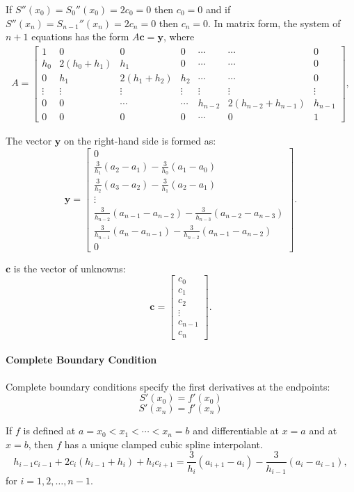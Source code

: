 \documentclass[a4paper]{article}
\begin{document}
\begin{sloppypar}
If \( S''(x_0) = S_0''(x_0) = 2c_0 = 0 \) then \( c_0 = 0 \) and if \( S''(x_n) = S_{n-1}''(x_n) = 2c_n = 0 \) then \( c_n = 0 \).
In matrix form, the system of $n+1$ equations has the form $A\mathbf{c} = \mathbf{y}$, where
$$
\begin{aligned}
A = \begin{bmatrix}
1 & 0 & 0 & 0 & \cdots & \cdots &0 \\
h_0 & 2(h_0 + h_1) & h_1 & 0 & \cdots& \cdots & 0 \\
0 & h_1 & 2(h_1 + h_2) & h_2 & \cdots& \cdots & 0 \\
\vdots & \vdots & \vdots & \vdots & \vdots & \vdots&\vdots \\
0 & 0 & \cdots & \cdots& h_{n-2} & 2(h_{n-2} + h_{n-1}) & h_{n-1} \\
0 & 0 & 0 & 0 & \cdots& 0 & 1
\end{bmatrix},
\end{aligned}
$$

The vector \(\mathbf{y}\) on the right-hand side is formed as:
\[
\mathbf{y} = \begin{bmatrix}
0 \\
\frac{3}{h_1}(a_2 - a_1) - \frac{3}{h_0}(a_1 - a_0) \\
\frac{3}{h_2}(a_3 - a_2) - \frac{3}{h_1}(a_2 - a_1) \\
\vdots \\
\frac{3}{h_{n-2}}(a_{n-1} - a_{n-2}) - \frac{3}{h_{n-3}}(a_{n-2} - a_{n-3}) \\
\frac{3}{h_{n-1}}(a_n - a_{n-1}) - \frac{3}{h_{n-2}}(a_{n-1} - a_{n-2}) \\
0
\end{bmatrix}.
\]

\(\mathbf{c}\) is the vector of unknowns:
\[
\mathbf{c} = \begin{bmatrix}
c_0 \\
c_1 \\
c_2 \\
\vdots \\
c_{n-1} \\
c_n
\end{bmatrix}.
\]

\paragraph*{Complete Boundary Condition}
Complete boundary conditions specify the first derivatives at the endpoints:
\[ S'(x_0) = f'(x_0) \]
\[ S'(x_n) = f'(x_n) \]

If \( f \) is defined at \( a = x_{0} < x_{1} < \cdots < x_{n} = b \) and differentiable at \( x = a \) and at \( x = b \), then \( f \) has a unique clamped cubic spline interpolant.
\[
h_{i-1}c_{i-1} + 2c_{i}(h_{i-1} + h_{i}) + h_{i}c_{i+1} = \frac{3}{h_{i}}(a_{i+1} - a_{i}) - \frac{3}{h_{i-1}}(a_{i} - a_{i-1}),
\]
for \( i = 1, 2, \ldots, n-1 \).


\end{sloppypar}
\end{document}
